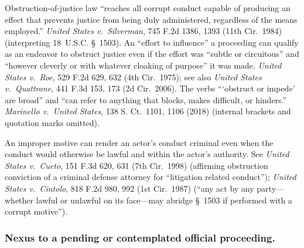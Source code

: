Obstruction-of-justice law ``reaches all corrupt conduct capable of producing an effect that prevents justice from being duly administered, regardless of the means employed.''
\textit{United States v.\ Silverman}, 745 F.2d 1386, 1393 (11th Cir.~1984) (interpreting 18~U.S.C. \S~1503).
An ``effort to influence'' a proceeding can qualify as an endeavor to obstruct justice even if the effort was ``subtle or circuitous'' and ``however cleverly or with whatever cloaking of purpose'' it was made.
\textit{United States v.\ Roe}, 529 F.2d 629, 632 (4th Cir.~1975);
see also \textit{United States v.\ Quattrone}, 441 F.3d 153, 173 (2d Cir.~2006).
The verbs ``\thinspace`obstruct or impede' are broad'' and ``can refer to anything that blocks, makes difficult, or hinders.''
\textit{Marinello v.\ United States}, 138 S. Ct.~1101, 1106 (2018) (internal brackets and quotation marks omitted).

An improper motive can render an actor's conduct criminal even when the conduct would otherwise be lawful and within the actor's authority.
See \textit{United States v.\ Cueto}, 151 F.3d 620, 631 (7th Cir.~1998) (affirming obstruction conviction of a criminal defense attorney for ``litigation related conduct''); \textit{United States v.\ Cintolo}, 818 F.2d 980, 992 (1st Cir.~1987) (``any act by any party---whether lawful or unlawful on its face---may abridge \S~1503 if performed with a corrupt motive'').

\subsubsection*{Nexus to a pending or contemplated official proceeding.}


